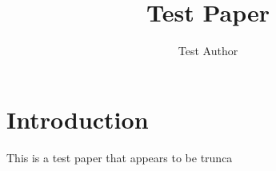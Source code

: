 \documentclass{article}
\begin{document}
\title{Test Paper}
\author{Test Author}
\maketitle

\section{Introduction}
This is a test paper that appears to be trunca
\end{document}

